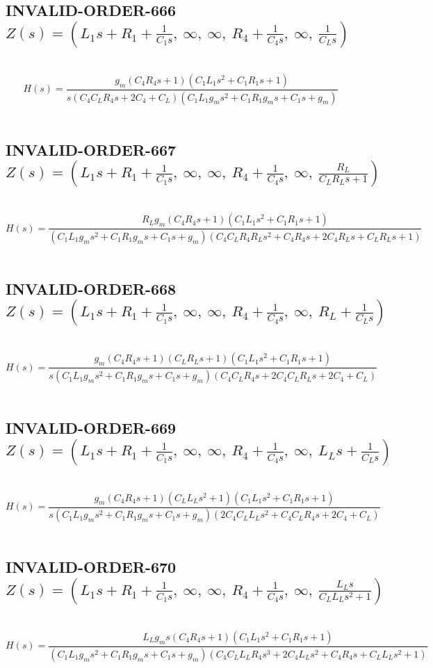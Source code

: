 \documentclass{article}
\begin{document}
\subsection{INVALID-ORDER-666 $Z(s) = \left( L_{1} s + R_{1} + \frac{1}{C_{1} s}, \  \infty, \  \infty, \  R_{4} + \frac{1}{C_{4} s}, \  \infty, \  \frac{1}{C_{L} s}\right)$ } \ 
\textbf{\[H(s) = \frac{g_{m} \left(C_{4} R_{4} s + 1\right) \left(C_{1} L_{1} s^{2} + C_{1} R_{1} s + 1\right)}{s \left(C_{4} C_{L} R_{4} s + 2 C_{4} + C_{L}\right) \left(C_{1} L_{1} g_{m} s^{2} + C_{1} R_{1} g_{m} s + C_{1} s + g_{m}\right)}\] } \ 
\subsection{INVALID-ORDER-667 $Z(s) = \left( L_{1} s + R_{1} + \frac{1}{C_{1} s}, \  \infty, \  \infty, \  R_{4} + \frac{1}{C_{4} s}, \  \infty, \  \frac{R_{L}}{C_{L} R_{L} s + 1}\right)$ } \ 
\textbf{\[H(s) = \frac{R_{L} g_{m} \left(C_{4} R_{4} s + 1\right) \left(C_{1} L_{1} s^{2} + C_{1} R_{1} s + 1\right)}{\left(C_{1} L_{1} g_{m} s^{2} + C_{1} R_{1} g_{m} s + C_{1} s + g_{m}\right) \left(C_{4} C_{L} R_{4} R_{L} s^{2} + C_{4} R_{4} s + 2 C_{4} R_{L} s + C_{L} R_{L} s + 1\right)}\] } \ 
\subsection{INVALID-ORDER-668 $Z(s) = \left( L_{1} s + R_{1} + \frac{1}{C_{1} s}, \  \infty, \  \infty, \  R_{4} + \frac{1}{C_{4} s}, \  \infty, \  R_{L} + \frac{1}{C_{L} s}\right)$ } \ 
\textbf{\[H(s) = \frac{g_{m} \left(C_{4} R_{4} s + 1\right) \left(C_{L} R_{L} s + 1\right) \left(C_{1} L_{1} s^{2} + C_{1} R_{1} s + 1\right)}{s \left(C_{1} L_{1} g_{m} s^{2} + C_{1} R_{1} g_{m} s + C_{1} s + g_{m}\right) \left(C_{4} C_{L} R_{4} s + 2 C_{4} C_{L} R_{L} s + 2 C_{4} + C_{L}\right)}\] } \ 
\subsection{INVALID-ORDER-669 $Z(s) = \left( L_{1} s + R_{1} + \frac{1}{C_{1} s}, \  \infty, \  \infty, \  R_{4} + \frac{1}{C_{4} s}, \  \infty, \  L_{L} s + \frac{1}{C_{L} s}\right)$ } \ 
\textbf{\[H(s) = \frac{g_{m} \left(C_{4} R_{4} s + 1\right) \left(C_{L} L_{L} s^{2} + 1\right) \left(C_{1} L_{1} s^{2} + C_{1} R_{1} s + 1\right)}{s \left(C_{1} L_{1} g_{m} s^{2} + C_{1} R_{1} g_{m} s + C_{1} s + g_{m}\right) \left(2 C_{4} C_{L} L_{L} s^{2} + C_{4} C_{L} R_{4} s + 2 C_{4} + C_{L}\right)}\] } \ 
\subsection{INVALID-ORDER-670 $Z(s) = \left( L_{1} s + R_{1} + \frac{1}{C_{1} s}, \  \infty, \  \infty, \  R_{4} + \frac{1}{C_{4} s}, \  \infty, \  \frac{L_{L} s}{C_{L} L_{L} s^{2} + 1}\right)$ } \ 
\textbf{\[H(s) = \frac{L_{L} g_{m} s \left(C_{4} R_{4} s + 1\right) \left(C_{1} L_{1} s^{2} + C_{1} R_{1} s + 1\right)}{\left(C_{1} L_{1} g_{m} s^{2} + C_{1} R_{1} g_{m} s + C_{1} s + g_{m}\right) \left(C_{4} C_{L} L_{L} R_{4} s^{3} + 2 C_{4} L_{L} s^{2} + C_{4} R_{4} s + C_{L} L_{L} s^{2} + 1\right)}\] } \ 
\end{document}
